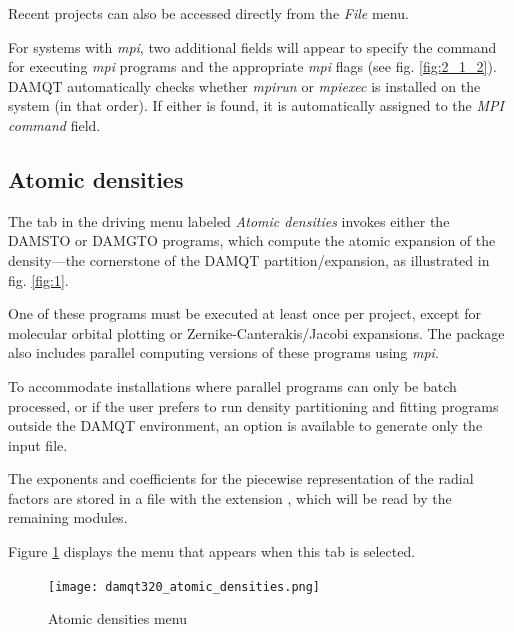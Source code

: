 \documentclass[10pt]{article}
\begin{document}
Recent projects can also be accessed directly from the {\it File} menu.

For systems with {\it mpi}, two additional fields will appear
to specify the command for executing {\it mpi} programs
and the appropriate {\it mpi} flags (see fig. \ref{fig:2_1_2}).
DAMQT automatically checks whether {\it mpirun} or {\it mpiexec}
is installed on the system (in that order).
If either is found, it is automatically assigned to the {\it MPI command} field.

\subsection{Atomic densities \label{sec:2.2}}

\begin{center}
\begin{minipage}{.59\linewidth}

The tab in the driving menu labeled {\it Atomic densities} invokes either the DAMSTO or DAMGTO programs,
which compute the atomic expansion of the density—the cornerstone of the DAMQT partition/expansion,
as illustrated in fig. \ref{fig:1}.

One of these programs must be executed at least once per project,
except for molecular orbital plotting or Zernike-Canterakis/Jacobi expansions.
The package also includes parallel computing versions of these programs using {\it mpi}.

To accommodate installations where parallel programs can only be batch processed,
or if the user prefers to run density partitioning and fitting programs
outside the DAMQT environment, an option is available to generate only the input file.

The exponents and coefficients for the piecewise representation of the radial factors
are stored in a file with the extension \damqt{ }, which will be read by the remaining modules.

Figure \ref{fig:2_2_1} displays the menu that appears when this tab is selected.

\end{minipage}
\begin{minipage}{.4\linewidth}

\begin{figure}[H]
\begin{center}
\texttt{[image: damqt320\_atomic\_densities.png]}
\end{center}
\caption{Atomic densities menu \label{fig:2_2_1}}
\end{figure}

\end{minipage}
\end{center}
\end{document}
